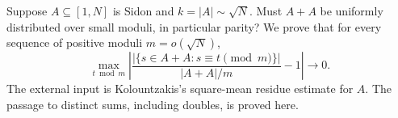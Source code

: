 Suppose $A\subseteq[1,N]$ is Sidon and $k=|A|\sim\sqrt N$. Must $A+A$ be uniformly distributed over small moduli, in particular parity? We prove that for every sequence of positive moduli $m=o(\sqrt N)$,
\[
 \max_{t\bmod m}\left|
 \frac{|\{s\in A+A:s\equiv t\pmod m\}|}{|A+A|/m}-1
 \right|\longrightarrow0.\tag{1}
\]
The external input is Kolountzakis's square-mean residue estimate for $A$. The passage to distinct sums, including doubles, is proved here.
